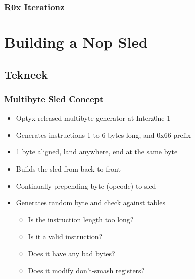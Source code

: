 \documentclass{beamer}
\newenvironment{sitemize}{\begin{itemize}\itemsep 5pt\large}{\end{itemize}}
\begin{document}
\newcommand{\incshi}[1]{\texttt{[image: \#1]}}

\begin{frame}
  \frametitle{R0x Iterationz}
  \only<9>{\incshi{shi8}}
  \only<8>{\incshi{shi7}}
  \only<7>{\incshi{shi6}}
  \only<6>{\incshi{shi5}}
  \only<5>{\incshi{shi4}}
  \only<4>{\incshi{shi3}}
  \only<3>{\incshi{shi2}}
  \only<2>{\incshi{shi1}}
  \only<1>{\incshi{shi0}}
\end{frame}

\section{Building a Nop Sled}

\subsection{Tekneek}

\begin{frame}
  \frametitle{Multibyte Sled Concept}
  \begin{sitemize}
    \item Optyx released multibyte generator at Interz0ne 1
    \item Generates instructions 1 to 6 bytes long, and 0x66 prefix
    \item 1 byte aligned, land anywhere, end at the same byte
  \end{sitemize}
  \begin{sitemize}
    \pause
    \item Builds the sled from back to front
    \item Continually prepending byte (opcode) to sled
    \item Generates random byte and check against tables
    \pause
    \begin{sitemize}
      \item Is the instruction length too long?
      \item Is it a valid instruction?
      \item Does it have any bad bytes?
      \item Does it modify don't-smash registers?
    \end{sitemize}
  \end{sitemize}
\end{frame}
\end{document}
